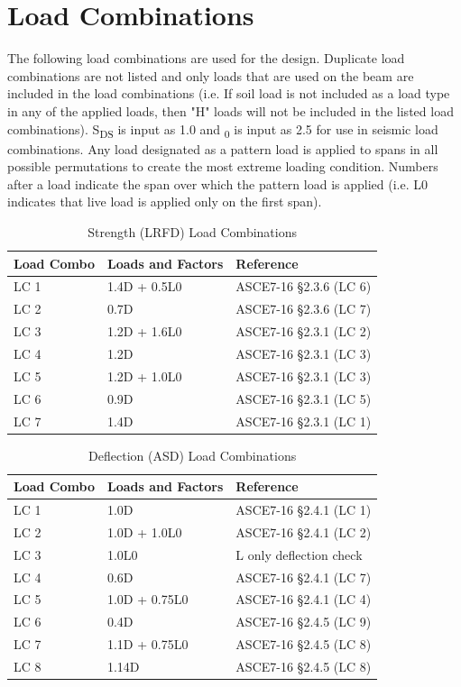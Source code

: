 \documentclass[12pt, fleqn]{article}
\begin{document}
\section{Load Combinations}
The following load combinations are used for the design. Duplicate load combinations are not listed and only loads that are used on the beam are included in the load combinations (i.e. If soil load is not included as a load type in any of the applied loads, then "H" loads will not be included in the listed load combinations). S\textsubscript{DS} is input as 1.0 and \textOmega\textsubscript{0} is input as 2.5 for use in seismic load combinations. Any load designated as a pattern load is applied to spans in all possible permutations to create the most extreme loading condition. Numbers after a load indicate the span over which the pattern load is applied (i.e. L0 indicates that live load is applied only on the first span).
\begin{table}[H]
\caption{Strength (LRFD) Load Combinations}
\centering
\begin{tabular}{l l l}
\hline
Load Combo & Loads and Factors & Reference\\
\hline
LC 1 & 1.4D + 0.5L0 & ASCE7-16 \S2.3.6 (LC 6)\\
LC 2 & 0.7D & ASCE7-16 \S2.3.6 (LC 7)\\
LC 3 & 1.2D + 1.6L0 & ASCE7-16 \S2.3.1 (LC 2)\\
LC 4 & 1.2D & ASCE7-16 \S2.3.1 (LC 3)\\
LC 5 & 1.2D + 1.0L0 & ASCE7-16 \S2.3.1 (LC 3)\\
LC 6 & 0.9D & ASCE7-16 \S2.3.1 (LC 5)\\
LC 7 & 1.4D & ASCE7-16 \S2.3.1 (LC 1)\\
\hline
\end{tabular}
\end{table}
\begin{table}[H]
\caption{Deflection (ASD) Load Combinations}
\centering
\begin{tabular}{l l l}
\hline
Load Combo & Loads and Factors & Reference\\
\hline
LC 1 & 1.0D & ASCE7-16 \S2.4.1 (LC 1)\\
LC 2 & 1.0D + 1.0L0 & ASCE7-16 \S2.4.1 (LC 2)\\
LC 3 & 1.0L0 & L only deflection check\\
LC 4 & 0.6D & ASCE7-16 \S2.4.1 (LC 7)\\
LC 5 & 1.0D + 0.75L0 & ASCE7-16 \S2.4.1 (LC 4)\\
LC 6 & 0.4D & ASCE7-16 \S2.4.5 (LC 9)\\
LC 7 & 1.1D + 0.75L0 & ASCE7-16 \S2.4.5 (LC 8)\\
LC 8 & 1.14D & ASCE7-16 \S2.4.5 (LC 8)\\
\hline
\end{tabular}
\end{table}
\end{document}
